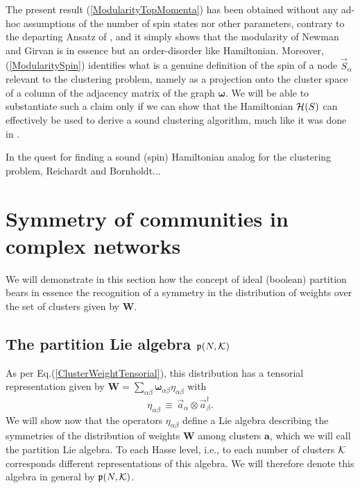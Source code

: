 \documentclass[twocolumn,aps,sort,nofootinbib]{revtex4}
\begin{document}
The present result (\ref{ModularityTopMomenta}) 
has been obtained without
any ad-hoc assumptions of the number of spin states nor other parameters, contrary
to the departing Ansatz of \cite{Reichardt06}, and it simply
shows that the modularity of Newman and Girvan is in essence but 
an order-disorder like Hamiltonian. 
Moreover, (\ref{ModularitySpin}) identifies what is a
genuine definition of the spin of a node $\overrightarrow{S}_\alpha$ 
relevant to the clustering problem, namely 
as a projection onto the cluster space of 
a column of the adjacency matrix of the graph $\boldsymbol{\omega}$. 
We will be able to substantiate such a claim
only if we can show that the Hamiltonian ${\cal H}({S})$ can effectively be used
to derive a sound clustering algorithm, much like it was done in \cite{Reichardt06}.

In the quest for finding a sound (spin) Hamiltonian analog for the clustering problem,
Reichardt and Bornholdt...

%
\section{Symmetry of communities in complex networks\label{secLieAlgebra}}
We will demonstrate in this section how the concept of ideal (boolean) partition
bears in essence the recognition of a symmetry in the distribution of weights
over the set of clusters given by $\boldsymbol{W}$.

\subsection{The partition Lie algebra $\mathfrak{p}(N,{\cal K})$}
As per Eq.(\ref{ClusterWeightTensorial}), 
this distribution has a tensorial representation
given by $\boldsymbol{W}=\sum_{\alpha\beta}\boldsymbol{\omega}_{\alpha\beta}\eta_{\alpha\beta}$ with
\begin{equation}
\eta_{\alpha\beta}\,\equiv\,\overrightarrow{a}_\alpha\otimes\overrightarrow{a}_\beta^\dagger.
\label{generators-PLieAlgebra}
\end{equation}
We will show now that the operators $\eta_{\alpha\beta}$ define a Lie algebra
describing the symmetries of the distribution of weights $\boldsymbol{W}$ among
clusters $\mathbf{a}$, which we will call the partition Lie algebra. 
To each Hasse level, i.e., to each number of clusters ${\cal K}$ 
corresponds different representations of this algebra. We will therefore
denote this algebra in general by $\mathfrak{p}(N,{\cal K})$. 
\end{document}
